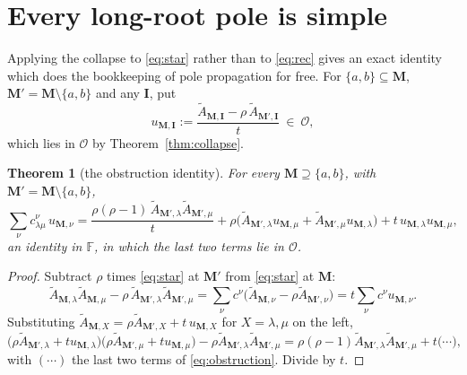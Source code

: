 \documentclass[11pt]{article}
\theoremstyle{plain}
\newtheorem{thm}{Theorem}
\theoremstyle{definition}
\theoremstyle{remark}
\theoremstyle{plain}
\newcommand{\bI}{\mathbf{I}}
\newcommand{\bM}{\mathbf{M}}
\newcommand{\At}{\widetilde{A}}
\begin{document}
\section{Every long-root pole is simple}
\label{sec:simple}

Applying the collapse to \eqref{eq:star} rather than to \eqref{eq:rec} gives an
exact identity which does the bookkeeping of pole propagation for free.  For
$\{a,b\}\subseteq\bM$, $\bM'=\bM\setminus\{a,b\}$ and any $\bI$, put
\begin{equation}
u_{\bM,\bI}:=\frac{\At_{\bM,\bI}-\rho\,\At_{\bM',\bI}}{t}\ \in\ \mathcal{O},
\label{eq:udef}
\end{equation}
which lies in $\mathcal{O}$ by Theorem~\ref{thm:collapse}.

\begin{thm}[the obstruction identity]\label{thm:recursion}
For every $\bM\supseteq\{a,b\}$, with $\bM'=\bM\setminus\{a,b\}$,
\begin{equation}
\sum_{\nu}c^{\nu}_{\lambda\mu}\,u_{\bM,\nu}
=\frac{\rho(\rho-1)\,\At_{\bM',\lambda}\At_{\bM',\mu}}{t}
+\rho\bigl(\At_{\bM',\lambda}u_{\bM,\mu}+\At_{\bM',\mu}u_{\bM,\lambda}\bigr)
+t\,u_{\bM,\lambda}u_{\bM,\mu},
\label{eq:obstruction}
\end{equation}
an identity in $\mathbb{F}$, in which the last two terms lie in $\mathcal{O}$.
\end{thm}
\begin{proof}
Subtract $\rho$ times \eqref{eq:star} at $\bM'$ from \eqref{eq:star} at $\bM$:
\[
\At_{\bM,\lambda}\At_{\bM,\mu}-\rho\,\At_{\bM',\lambda}\At_{\bM',\mu}
=\sum_{\nu}c^{\nu}\bigl(\At_{\bM,\nu}-\rho\At_{\bM',\nu}\bigr)
=t\sum_{\nu}c^{\nu}u_{\bM,\nu}.
\]
Substituting $\At_{\bM,X}=\rho\At_{\bM',X}+t\,u_{\bM,X}$ for $X=\lambda,\mu$
on the left,
\[
\bigl(\rho\At_{\bM',\lambda}+tu_{\bM,\lambda}\bigr)
\bigl(\rho\At_{\bM',\mu}+tu_{\bM,\mu}\bigr)
-\rho\At_{\bM',\lambda}\At_{\bM',\mu}
=\rho(\rho-1)\At_{\bM',\lambda}\At_{\bM',\mu}+t\bigl(\cdots\bigr),
\]
with $(\cdots)$ the last two terms of \eqref{eq:obstruction}.  Divide by $t$.
\end{proof}
\end{document}
